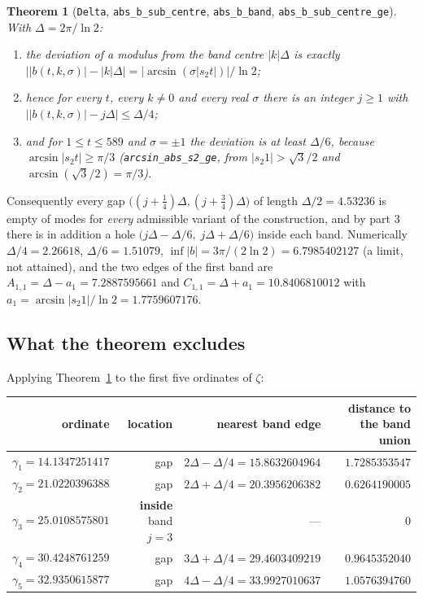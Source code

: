 \documentclass[11pt,a4paper]{article}
\newcommand{\lb}{\_\allowbreak}
\newcommand{\code}[1]{\texttt{#1}}
\newtheorem{theorem}{Theorem}[section]
\theoremstyle{definition}
\theoremstyle{remark}
\begin{document}
\begin{theorem}[\code{Delta}, \code{abs\lb b\lb sub\lb centre}, \code{abs\lb b\lb band},
\code{abs\lb b\lb sub\lb centre\lb ge}]\label{thm:bands}
With $\Delta = 2\pi/\ln 2$:

\begin{enumerate}
\item the deviation of a modulus from the band centre $|k|\Delta$ is exactly
  $\bigl||b(t,k,\sigma)| - |k|\Delta\bigr| = |\arcsin(\sigma|s_2 t|)|/\ln 2$;
\item hence for every $t$, every $k \ne 0$ and every real $\sigma$ there is an integer $j \ge 1$
  with $\bigl||b(t,k,\sigma)| - j\Delta\bigr| \le \Delta/4$;
\item and for $1 \le t \le 589$ and $\sigma = \pm 1$ the deviation is at least $\Delta/6$, because
  $\arcsin|s_2 t| \ge \pi/3$ (\code{arcsin\lb abs\lb s2\lb ge}, from $|s_2 1| > \sqrt3/2$ and
  $\arcsin(\sqrt3/2) = \pi/3$).
\end{enumerate}
\end{theorem}

Consequently every gap $\bigl((j+\tfrac14)\Delta,(j+\tfrac34)\Delta\bigr)$ of length
$\Delta/2 = 4.53236$ is empty of modes for \emph{every} admissible variant of the construction, and
by part 3 there is in addition a hole $\bigl(j\Delta - \Delta/6,\; j\Delta + \Delta/6\bigr)$ inside
each band. Numerically $\Delta/4 = 2.26618$, $\Delta/6 = 1.51079$,
$\inf |b| = 3\pi/(2\ln 2) = 6.7985402127$ (a limit, not attained), and the two edges of the first
band are $A_{1,1} = \Delta - a_1 = 7.2887595661$ and $C_{1,1} = \Delta + a_1 = 10.8406810012$ with
$a_1 = \arcsin|s_2 1|/\ln 2 = 1.7759607176$.

\subsection{What the theorem excludes}

Applying Theorem~\ref{thm:bands} to the first five ordinates of $\zeta$:

\begin{center}
\small
\begin{tabular}{rrrr}
\toprule
ordinate & location & nearest band edge & distance to the band union \\
\midrule
$\gamma_1 = 14.1347251417$ & gap & $2\Delta-\Delta/4 = 15.8632604964$ & $1.7285353547$ \\
$\gamma_2 = 21.0220396388$ & gap & $2\Delta+\Delta/4 = 20.3956206382$ & $0.6264190005$ \\
$\gamma_3 = 25.0108575801$ & \textbf{inside} band $j = 3$ & --- & $0$ \\
$\gamma_4 = 30.4248761259$ & gap & $3\Delta+\Delta/4 = 29.4603409219$ & $0.9645352040$ \\
$\gamma_5 = 32.9350615877$ & gap & $4\Delta-\Delta/4 = 33.9927010637$ & $1.0576394760$ \\
\bottomrule
\end{tabular}
\end{center}
\end{document}
